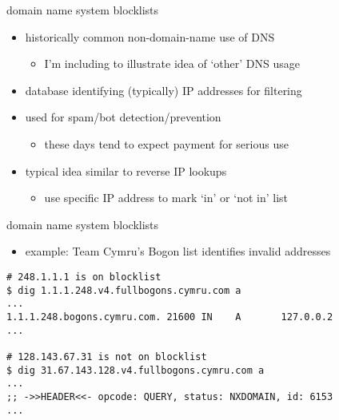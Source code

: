 \begin{frame}[fragile]{domain name system blocklists}
\begin{itemize}
    \item historically common non-domain-name use of DNS
        \begin{itemize}
        \item I'm including to illustrate idea of `other' DNS usage
        \end{itemize}
    \vspace{.5cm}
    \item database identifying (typically) IP addresses for filtering
    \item used for spam/bot detection/prevention
        \begin{itemize}
        \item these days tend to expect payment for serious use
        \end{itemize}
    \item typical idea similar to reverse IP lookups
        \begin{itemize}
        \item use specific IP address to mark `in' or `not in' list
        \end{itemize}
\end{itemize}
\end{frame}

\begin{frame}[fragile]{domain name system blocklists}
\begin{itemize}
    \item example: Team Cymru's Bogon list identifies invalid addresses
\end{itemize}
\begin{Verbatim}[fontsize=\small]
# 248.1.1.1 is on blocklist
$ dig 1.1.1.248.v4.fullbogons.cymru.com a
...
1.1.1.248.bogons.cymru.com. 21600 IN    A       127.0.0.2
...

# 128.143.67.31 is not on blocklist
$ dig 31.67.143.128.v4.fullbogons.cymru.com a
...
;; ->>HEADER<<- opcode: QUERY, status: NXDOMAIN, id: 6153
...
\end{Verbatim}
\end{frame}
